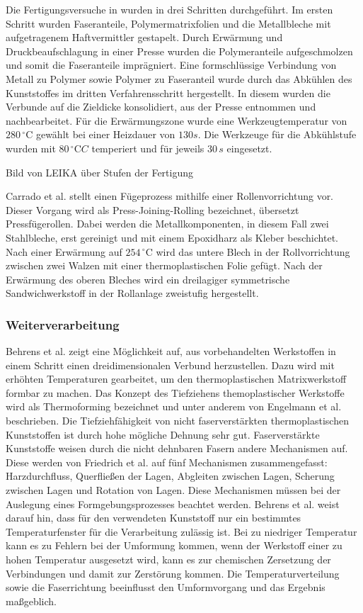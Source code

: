 Die Fertigungsversuche in \cite{LEIKA.2017} wurden in drei Schritten durchgeführt.
Im ersten Schritt wurden Faseranteile, Polymermatrixfolien und die Metallbleche mit aufgetragenem Haftvermittler gestapelt.
Durch Erwärmung und Druckbeaufschlagung in einer Presse wurden die Polymeranteile aufgeschmolzen und somit die Faseranteile imprägniert.
Eine formschlüssige Verbindung von Metall zu Polymer sowie Polymer zu Faseranteil wurde durch das Abkühlen des Kunststoffes im dritten Verfahrensschritt hergestellt.
In diesem wurden die Verbunde auf die Zieldicke konsolidiert, aus der Presse entnommen und nachbearbeitet.
Für die Erwärmungszone wurde eine Werkzeugtemperatur von $280\, ^\circ \text{C}$ gewählt bei einer Heizdauer von $130 s$.
Die Werkzeuge für die Abkühlstufe wurden mit $80\, ^\circ\text{C} C$ temperiert und für jeweils $30\, s$ eingesetzt. \cite{LEIKA.2017}

Bild von LEIKA über Stufen der Fertigung

Carrado et al. \cite{Carrado.2010} stellt einen Fügeprozess mithilfe einer Rollenvorrichtung vor.
Dieser Vorgang wird als Press-Joining-Rolling bezeichnet, übersetzt Pressfügerollen.
Dabei werden die Metallkomponenten, in diesem Fall zwei Stahlbleche, erst gereinigt und mit einem Epoxidharz als Kleber beschichtet.
Nach einer Erwärmung auf $254 \, ^\circ \text{C}$ wird das untere Blech in der Rollvorrichtung zwischen zwei Walzen mit einer thermoplastischen Folie gefügt.
Nach der Erwärmung des oberen Bleches wird ein dreilagiger symmetrische Sandwichwerkstoff in der Rollanlage zweistufig hergestellt.

\subsubsection{Weiterverarbeitung}

Behrens et al. \cite{Behrens.2014} zeigt eine Möglichkeit auf, aus vorbehandelten Werkstoffen in einem Schritt einen dreidimensionalen Verbund herzustellen.
Dazu wird mit erhöhten Temperaturen gearbeitet, um den thermoplastischen Matrixwerkstoff formbar zu machen.
Das Konzept des Tiefziehens themoplastischer Werkstoffe wird als Thermoforming bezeichnet und unter anderem von Engelmann et al. \cite{Engelmann.2012} beschrieben.
Die Tiefziehfähigkeit von nicht faserverstärkten thermoplastischen Kunststoffen ist durch hohe mögliche Dehnung sehr gut.
Faserverstärkte Kunststoffe weisen durch die nicht dehnbaren Fasern andere Mechanismen auf.
Diese werden von Friedrich et al. \cite{Friedrich.1997} auf fünf Mechanismen zusammengefasst: Harzdurchfluss, Querfließen der Lagen, Abgleiten zwischen Lagen, Scherung zwischen Lagen und Rotation von Lagen.
Diese Mechanismen müssen bei der Auslegung eines Formgebungsprozesses beachtet werden.
Behrens et al. \cite{Behrens.2014} weist darauf hin, dass für den verwendeten Kunststoff nur ein bestimmtes Temperaturfenster für die Verarbeitung zulässig ist.
Bei zu niedriger Temperatur kann es zu Fehlern bei der Umformung kommen, wenn der Werkstoff einer zu hohen Temperatur ausgesetzt wird, kann es zur chemischen Zersetzung der Verbindungen und damit zur Zerstörung kommen.
Die Temperaturverteilung sowie die Faserrichtung beeinflusst den Umformvorgang und das Ergebnis maßgeblich.

